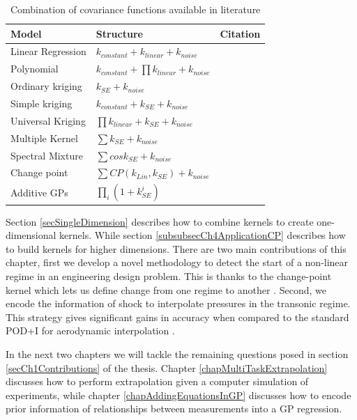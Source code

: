\begin{table}[!ht]
    \centering
\begin{tabularx}{\textwidth}{|l|l|X|}
  \hline
Model  & Structure & Citation \\
  \hline 
  \hline
Linear Regression & \small $k_{constant}+k_{linear}+k_{noise}$ &  \normalsize\\
Polynomial & \small $k_{constant}+\prod k_{linear}+k_{noise}$ &  \normalsize\\
Ordinary kriging & \small $k_{SE} + k_{noise}$ \normalsize &  \cite{krige1951statistical} \\
Simple kriging & \small $k_{constant}+k_{SE} + k_{noise}$ &  \normalsize\\
Universal Kriging & \small $\prod k_{linear}+k_{SE} + k_{noise}$ \normalsize & \cite{matheron1963principles} \\ Multiple Kernel & \small $\sum k_{SE} + k_{noise}$ \normalsize  &  \\
Spectral Mixture & \small  $\sum cos k_{SE} + k_{noise} $ \normalsize & \cite{wilson2013gaussian} \\
Change point & \small  $\sum CP(k_{Lin}, k_{SE}) + k_{noise} $ \normalsize & \cite{osborne2010bayesian} \\
Additive GPs & \small  $\prod_{i}(1+k^{i}_{SE}) $ \normalsize& \cite{duvenaud2011additive} \normalsize\\
   \hline
\end{tabularx}
  \caption{Combination of covariance functions available in literature}
  \label{tabListOfCombinationOfCovarianceFunctions}
  \end{table}

Section \ref{secSingleDimension} describes how to combine kernels to create one-dimensional kernels. While section \ref{subsubsecCh4ApplicationCP} describes how to build kernels for higher dimensions. There are two main contributions of this chapter, first we develop a novel methodology to detect the start of a non-linear regime in an engineering design problem. This is thanks to the change-point kernel which lets us define change from one regime to another \cite{chiplunkar:hal-01555401}. Second, we encode the information of shock to interpolate pressures in the transonic regime. This strategy gives significant gains in accuracy when compared to the standard POD+I for aerodynamic interpolation \cite{oatao18004}. 

In the next two chapters we will tackle the remaining questions posed in section \ref{secCh1Contributions} of the thesis. Chapter \ref{chapMultiTaskExtrapolation} discusses how to perform extrapolation given a computer simulation of experiments, while chapter \ref{chapAddingEquationsInGP} discusses how to encode prior information of relationships between measurements into a GP regression. 
